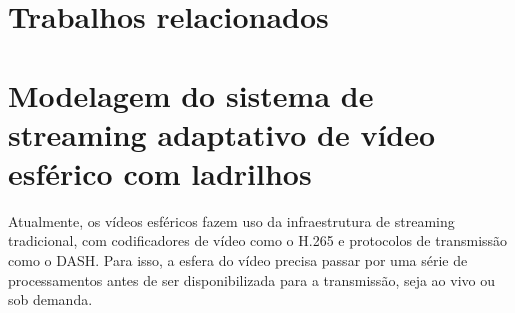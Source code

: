  \chapter{Trabalhos relacionados}




\chapter{Modelagem do sistema de streaming adaptativo de vídeo esférico com ladrilhos}\label{Cap:Problem Design}

Atualmente, os vídeos esféricos fazem uso da infraestrutura de streaming tradicional, com codificadores de vídeo como o H.265 e protocolos de transmissão como o DASH. Para isso, a esfera do vídeo precisa passar por uma série de processamentos antes de ser disponibilizada para a transmissão, seja ao vivo ou sob demanda.

